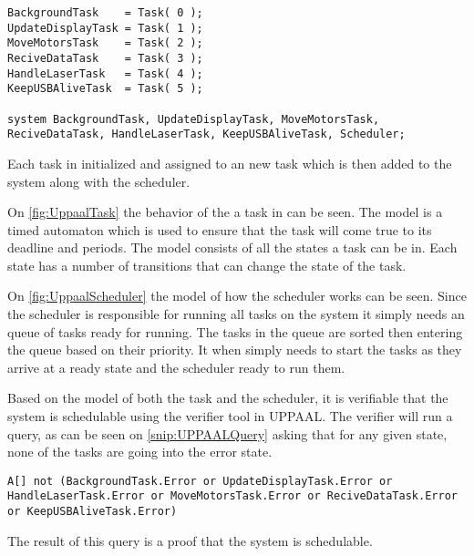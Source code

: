 \begin{lstlisting}[label={snip:UPPAALSystemDeclaration},caption={System declaration from UPPAAL},frame=tlrb,numbers=none]
BackgroundTask    = Task( 0 );
UpdateDisplayTask = Task( 1 );
MoveMotorsTask    = Task( 2 );
ReciveDataTask    = Task( 3 );
HandleLaserTask   = Task( 4 );
KeepUSBAliveTask  = Task( 5 );

system BackgroundTask, UpdateDisplayTask, MoveMotorsTask, ReciveDataTask, HandleLaserTask, KeepUSBAliveTask, Scheduler;
\end{lstlisting}
Each task in initialized and assigned to an new task which is then added to the system along with the scheduler. 

On \autoref{fig:UppaalTask} the behavior of the a task in can be seen. 
The model is a timed automaton which is used to ensure that the task will come true to its deadline and periods. 
The model consists of all the states a task can be in.
Each state has a number of transitions that can change the state of the task. 


On \autoref{fig:UppaalScheduler} the model of how the scheduler works can be seen. 
Since the scheduler is responsible for running all tasks on the system it simply needs an queue of tasks ready for running. 
The tasks in the queue are sorted then entering the queue based on their priority. 
It when simply needs to start the tasks as they arrive at a ready state and the scheduler ready to run them.


Based on the model of both the task and the scheduler, it is verifiable that the system is schedulable using the verifier tool in UPPAAL. 
The verifier will run a query, as can be seen on \autoref{snip:UPPAALQuery} asking that for any given state, none of the tasks are going into the error state. 
\begin{lstlisting}[label={snip:UPPAALQuery},caption={Query from UPPAAL verifier},frame=tlrb,numbers=none]
A[] not (BackgroundTask.Error or UpdateDisplayTask.Error or HandleLaserTask.Error or MoveMotorsTask.Error or ReciveDataTask.Error or KeepUSBAliveTask.Error)
\end{lstlisting}
The result of this query is a proof that the system is schedulable. 